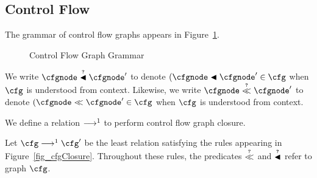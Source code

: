 \documentclass{article}
\begin{document}
    \subsection{Control Flow}

    The grammar of control flow graphs appears in Figure~\ref{fig_cfgGrammar}.  

    \begin{figure}\center
        \begin{grammar}
        \end{grammar}
        \caption{Control Flow Graph Grammar}
        \label{fig_cfgGrammar}
    \end{figure}



    We write $\cfgnode \islexicallyBefore \cfgnode'$ to denote $(\cfgnode \lexicallyBefore \cfgnode' \in \cfg$ when $\cfg$ is understood from context.  Likewise, we write $\cfgnode \isbefore \cfgnode'$ to denote $(\cfgnode \before \cfgnode' \in \cfg$ when $\cfg$ is understood from context.

    We define a relation $\mathrel{\longrightarrow^1}$ to perform control flow graph closure.

    \begin{definition}
        Let $\cfg \cfgClosureStep \cfg'$ be the least relation satisfying the rules appearing in Figure~\ref{fig_cfgClosure}.  Throughout these rules, the predicates $\isbefore$ and $\mathrel{\stackrel{{\scriptscriptstyle\boldsymbol{?}}}{\blacktriangleleft}}$ refer to graph $\cfg$.
    \end{definition}
\end{document}
